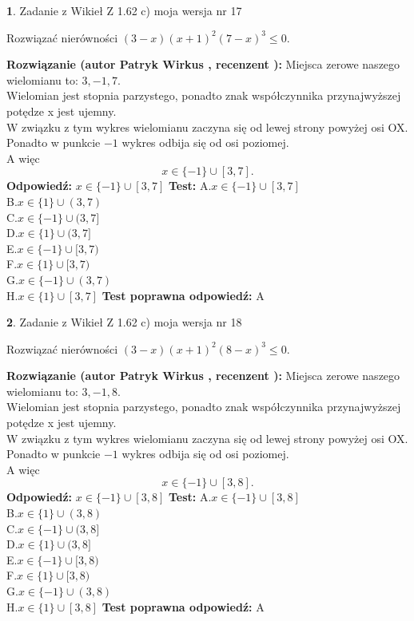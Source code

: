 \documentclass[12pt, a4paper]{article}
\theoremstyle{definition} %
\newtheorem{zad}{}
\newcommand{\zadStart}[1]{\begin{zad}#1\newline}
\newcommand{\zadStop}{\end{zad}}
\newcommand{\rozwStart}[2]{\noindent \textbf{Rozwiązanie (autor #1 , recenzent #2): }\newline}
\newcommand{\rozwStop}{\newline}
\newcommand{\odpStart}{\noindent \textbf{Odpowiedź:}\newline}
\newcommand{\odpStop}{\newline}
\newcommand{\testStart}{\noindent \textbf{Test:}\newline}
\newcommand{\testStop}{\newline}
\newcommand{\kluczStart}{\noindent \textbf{Test poprawna odpowiedź:}\newline}
\newcommand{\kluczStop}{\newline}
\begin{document}
\zadStart{Zadanie z Wikieł Z 1.62 c) moja wersja nr 17}

Rozwiązać nierówności $(3-x)(x+1)^{2}(7-x)^{3}\le0$.
\zadStop
\rozwStart{Patryk Wirkus}{}
Miejsca zerowe naszego wielomianu to: $3, -1, 7$.\\
Wielomian jest stopnia parzystego, ponadto znak współczynnika przy\linebreak najwyższej potędze x jest ujemny.\\ W związku z tym wykres wielomianu zaczyna się od lewej strony powyżej osi OX.\\
Ponadto w punkcie $-1$ wykres odbija się od osi poziomej.\\
A więc $$x \in \{-1\} \cup [3,7].$$
\rozwStop
\odpStart
$x \in \{-1\} \cup [3,7]$
\odpStop
\testStart
A.$x \in \{-1\} \cup [3,7]$\\
B.$x \in \{1\} \cup (3,7)$\\
C.$x \in \{-1\} \cup (3,7]$\\
D.$x \in \{1\} \cup (3,7]$\\
E.$x \in \{-1\} \cup [3,7)$\\
F.$x \in \{1\} \cup [3,7)$\\
G.$x \in \{-1\} \cup (3,7)$\\
H.$x \in \{1\} \cup [3,7]$
\testStop
\kluczStart
A
\kluczStop



\zadStart{Zadanie z Wikieł Z 1.62 c) moja wersja nr 18}

Rozwiązać nierówności $(3-x)(x+1)^{2}(8-x)^{3}\le0$.
\zadStop
\rozwStart{Patryk Wirkus}{}
Miejsca zerowe naszego wielomianu to: $3, -1, 8$.\\
Wielomian jest stopnia parzystego, ponadto znak współczynnika przy\linebreak najwyższej potędze x jest ujemny.\\ W związku z tym wykres wielomianu zaczyna się od lewej strony powyżej osi OX.\\
Ponadto w punkcie $-1$ wykres odbija się od osi poziomej.\\
A więc $$x \in \{-1\} \cup [3,8].$$
\rozwStop
\odpStart
$x \in \{-1\} \cup [3,8]$
\odpStop
\testStart
A.$x \in \{-1\} \cup [3,8]$\\
B.$x \in \{1\} \cup (3,8)$\\
C.$x \in \{-1\} \cup (3,8]$\\
D.$x \in \{1\} \cup (3,8]$\\
E.$x \in \{-1\} \cup [3,8)$\\
F.$x \in \{1\} \cup [3,8)$\\
G.$x \in \{-1\} \cup (3,8)$\\
H.$x \in \{1\} \cup [3,8]$
\testStop
\kluczStart
A
\kluczStop
\end{document}
